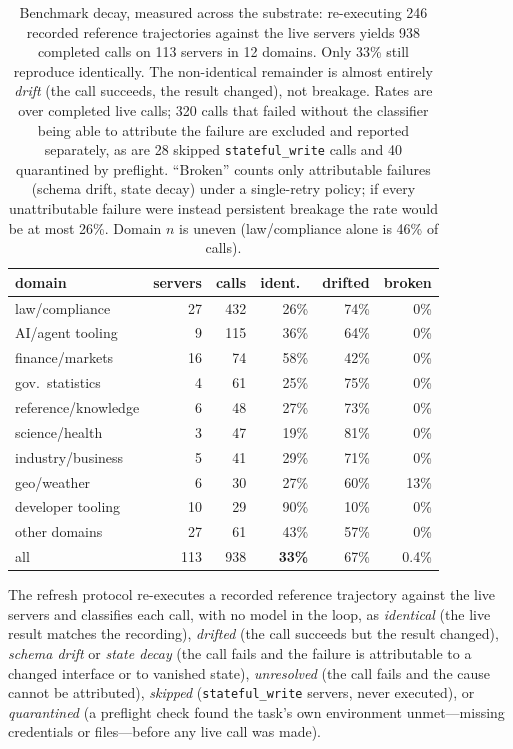 \begin{table}[t]
  \centering \footnotesize
  \setlength{\tabcolsep}{2.5pt}
  \begin{tabular}{lrrrrr}
    \toprule
    domain & servers & calls & ident.\ & drifted & broken \\
    \midrule
    law/compliance      & 27 & 432 & 26\% & 74\% & 0\% \\
    AI/agent tooling    &  9 & 115 & 36\% & 64\% & 0\% \\
    finance/markets     & 16 &  74 & 58\% & 42\% & 0\% \\
    gov.\ statistics    &  4 &  61 & 25\% & 75\% & 0\% \\
    reference/knowledge &  6 &  48 & 27\% & 73\% & 0\% \\
    science/health      &  3 &  47 & 19\% & 81\% & 0\% \\
    industry/business   &  5 &  41 & 29\% & 71\% & 0\% \\
    geo/weather         &  6 &  30 & 27\% & 60\% & 13\% \\
    developer tooling   & 10 &  29 & 90\% & 10\% & 0\% \\
    other domains       & 27 &  61 & 43\% & 57\% & 0\% \\
    \midrule
    all & 113 & 938 & \textbf{33\%} & 67\% & 0.4\% \\
    \bottomrule
  \end{tabular}
  \caption{Benchmark decay, measured across the substrate: re-executing 246
    recorded reference trajectories against the live servers yields 938
    completed calls on 113 servers in 12 domains. Only 33\% still reproduce
    identically. The non-identical remainder is almost entirely \emph{drift}
    (the call succeeds, the result changed), not breakage. Rates are over
    completed live calls; 320 calls that failed without the classifier being
    able to attribute the failure are excluded and reported separately, as are
    28 skipped \texttt{stateful\_write} calls and 40 quarantined by preflight.
    ``Broken'' counts only attributable failures (schema drift, state decay)
    under a single-retry policy; if every unattributable failure were instead
    persistent breakage the rate would be at most 26\%. Domain $n$ is uneven
    (law/compliance alone is 46\% of calls).}
  \label{tab:decay}
\end{table}

The refresh protocol re-executes a recorded reference trajectory against the
live servers and classifies each call, with no model in the loop, as
\emph{identical} (the live result matches the recording), \emph{drifted} (the
call succeeds but the result changed), \emph{schema drift} or \emph{state decay}
(the call fails and the failure is attributable to a changed interface or to
vanished state), \emph{unresolved} (the call fails and the cause cannot be
attributed), \emph{skipped} (\texttt{stateful\_write} servers, never executed),
or \emph{quarantined} (a preflight check found the task's own environment
unmet---missing credentials or files---before any live call was made).


